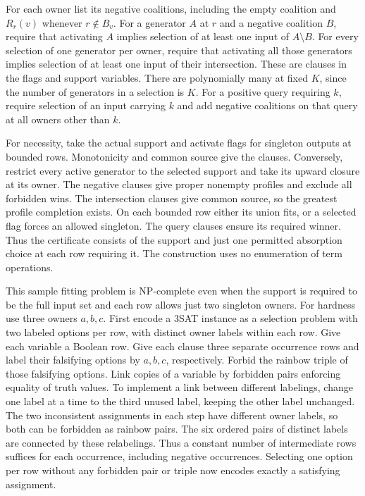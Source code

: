 For each owner list its negative coalitions, including
the empty coalition and $R_r(v)$ whenever $r\notin B_v$.
For a generator $A$ at $r$ and a negative coalition $B$,
require that activating $A$ implies selection of at least
one input of $A\setminus B$. For every selection of one
generator per owner, require that activating all those
generators implies selection of at least one input of
their intersection. These are clauses in the flags and
support variables. There are polynomially many at fixed
$K$, since the number of generators in a selection is $K$.
For a positive query requiring $k$, require selection of
an input carrying $k$ and add negative coalitions on that
query at all owners other than $k$.

For necessity, take the actual support and activate flags
for singleton outputs at bounded rows. Monotonicity and
common source give the clauses. Conversely, restrict
every active generator to the selected support and take
its upward closure at its owner. The negative clauses
give proper nonempty profiles and exclude all forbidden
wins. The intersection clauses give common source, so the
greatest profile completion exists. On each bounded row
either its union fits, or a selected flag forces an allowed
singleton. The query clauses ensure its required winner.
Thus the certificate consists of the support and just one
permitted absorption choice at each row requiring it.
The construction uses no enumeration of term operations.

This sample fitting problem is NP-complete even when the
support is required to be the full input set and each row
allows just two singleton owners. For hardness use three
owners $a,b,c$. First encode a 3SAT instance as a selection
problem with two labeled options per row, with distinct
owner labels within each row. Give each variable a Boolean
row. Give each clause three separate occurrence rows and
label their falsifying options by $a,b,c$, respectively.
Forbid the rainbow triple of those falsifying options.
Link copies of a variable by forbidden pairs enforcing
equality of truth values. To implement a link between
different labelings, change one label at a time to the
third unused label, keeping the other label unchanged.
The two inconsistent assignments in each step have
different owner labels, so both can be forbidden as
rainbow pairs. The six ordered pairs of distinct labels
are connected by these relabelings. Thus a constant
number of intermediate rows suffices for each occurrence,
including negative occurrences. Selecting one option
per row without any forbidden pair or triple now encodes
exactly a satisfying assignment.

